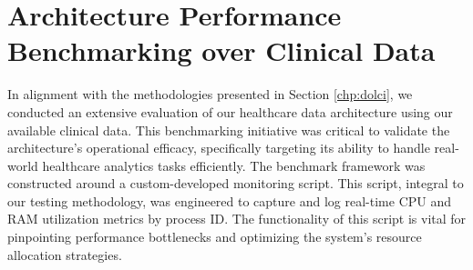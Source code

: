 \section{Architecture Performance Benchmarking over Clinical Data}
In alignment with the methodologies presented in Section \ref{chp:dolci}, we conducted an extensive evaluation of our healthcare data architecture using our available clinical data. This benchmarking initiative was critical to validate the architecture's operational efficacy, specifically targeting its ability to handle real-world healthcare analytics tasks efficiently.
The benchmark framework was constructed around a custom-developed monitoring script. This script, integral to our testing methodology, was engineered to capture and log real-time CPU and RAM utilization metrics by process ID. The functionality of this script is vital for pinpointing performance bottlenecks and optimizing the system's resource allocation strategies.
